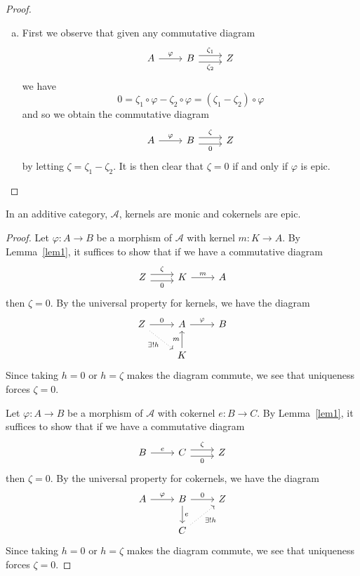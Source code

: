 \documentclass[10pt]{amsart}
\begin{document}
\begin{lem}
\begin{proof}
\begin{enumerate}[(a)]
    \item
      First we observe that given any commutative diagram
      $$\begin{tikzcd}
	A\arrow{r}{\varphi} & B \arrow[shift left = 0.75ex]{r}{\zeta_1} \arrow[shift right=0.75ex, swap]{r}{\zeta_2}& Z
      \end{tikzcd}$$
      we have
      $$0 = \zeta_1 \circ \varphi - \zeta_2 \circ \varphi = (\zeta_1 - \zeta_2) \circ \varphi $$
      and so we obtain the commutative diagram
      $$\begin{tikzcd}
	A\arrow{r}{\varphi} & B \arrow[shift left = 0.75ex]{r}{\zeta} \arrow[shift right=0.75ex, swap]{r}{0} & Z
      \end{tikzcd}$$
      by letting $\zeta = \zeta_1 - \zeta_2$.
      It is then clear that $\zeta = 0$ if and only if $\varphi$ is epic.
    \end{enumerate}
  \end{proof}
\end{lem}

\begin{lem}\label{lem2}
  In an additive category, $\mathcal{A}$, kernels are monic and cokernels are epic.
  \begin{proof}
    Let $\varphi : A \rightarrow B$ be a morphism of $\mathcal{A}$ with kernel $m : K \rightarrow A$.
    By Lemma~\ref{lem1}, it suffices to show that if we have a commutative diagram
    $$\begin{tikzcd}
      Z \arrow[shift left = 0.75ex]{r}{\zeta} \arrow[shift right=0.75ex, swap]{r}{0}& K\arrow{r}{m} & A
    \end{tikzcd}$$
    then $\zeta = 0$.
    By the universal property for kernels, we have the diagram
    $$\begin{tikzcd}
      Z \arrow{r}{0} \arrow[dotted,swap]{rd}{\exists ! h}& A \arrow{r}{\varphi} & B\\
      & K \arrow{u}{m}
    \end{tikzcd}$$
    Since taking $h= 0 $ or $h = \zeta$ makes the diagram commute, we see that uniqueness forces $\zeta = 0$.
    
    Let $\varphi : A \rightarrow B$ be a morphism of $\mathcal{A}$ with cokernel $e : B \rightarrow C$.
    By Lemma~\ref{lem1}, it suffices to show that if we have a commutative diagram
    $$\begin{tikzcd}
      B\arrow{r}{e} & C \arrow[shift left = 0.75ex]{r}{\zeta} \arrow[shift right=0.75ex, swap]{r}{0} & Z
    \end{tikzcd}$$
    then $\zeta = 0$.
    By the universal property for cokernels, we have the diagram
    $$\begin{tikzcd}
      A \arrow{r}{\varphi} & B \arrow{d}{e}\arrow{r}{0} & Z\\
      & C \arrow[dotted,swap]{ur}{\exists ! h}
    \end{tikzcd}$$
    Since taking $h= 0 $ or $h = \zeta$ makes the diagram commute, we see that uniqueness forces $\zeta = 0$.
  \end{proof}
\end{lem}
\end{document}
